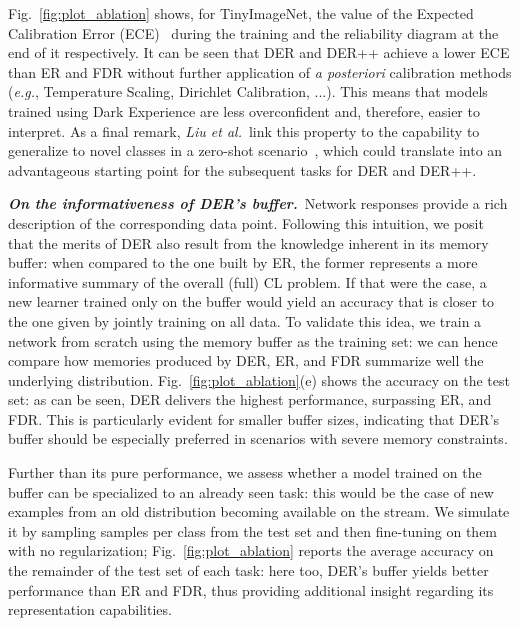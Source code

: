 \documentclass{article}
\begin{document}
Fig.~\ref{fig:plot_ablation} shows, for TinyImageNet, the value of the Expected Calibration Error (ECE)~\cite{naeini2015obtaining} during the training and the reliability diagram at the end of it respectively.
It can be seen that DER and DER++ achieve a lower ECE than ER and FDR without further application of \textit{a posteriori} calibration methods (\textit{e.g.}, Temperature Scaling, Dirichlet Calibration, ...). This means that models trained using Dark Experience are less overconfident and, therefore, easier to interpret. As a final remark, \textit{Liu et al.}\ link this property to the capability to generalize to novel classes in a zero-shot scenario~\cite{liu2018generalized}, which could translate into an advantageous starting point for the subsequent tasks for DER and DER++.

\textbf{\textit{On the informativeness of DER's buffer.}}~Network responses provide a rich description of the corresponding data point. Following this intuition, we posit that the merits of DER also result from the knowledge inherent in its memory buffer: when compared to the one built by ER, the former represents a more informative summary of the overall (full) CL problem. If that were the case, a new learner trained only on the buffer would yield an accuracy that is closer to the one given by jointly training on all data. To validate this idea, we train a network from scratch using the memory buffer as the training set: we can hence compare how memories produced by DER, ER, and FDR summarize well the underlying distribution. Fig.~\ref{fig:plot_ablation}(e) shows the accuracy on the test set: as can be seen, DER delivers the highest performance, surpassing ER, and FDR. This is particularly evident for smaller buffer sizes, indicating that DER's buffer should be especially preferred in scenarios with severe memory constraints.

Further than its pure performance, we assess whether a model trained on the buffer can be specialized to an already seen task: this would be the case of new examples from an old distribution becoming available on the stream. We simulate it by sampling  samples per class from the test set and then fine-tuning on them with no regularization; Fig.~\ref{fig:plot_ablation} reports the average accuracy on the remainder of the test set of each task: here too, DER's buffer yields better performance than ER and FDR, thus providing additional insight regarding its representation capabilities.
\end{document}

